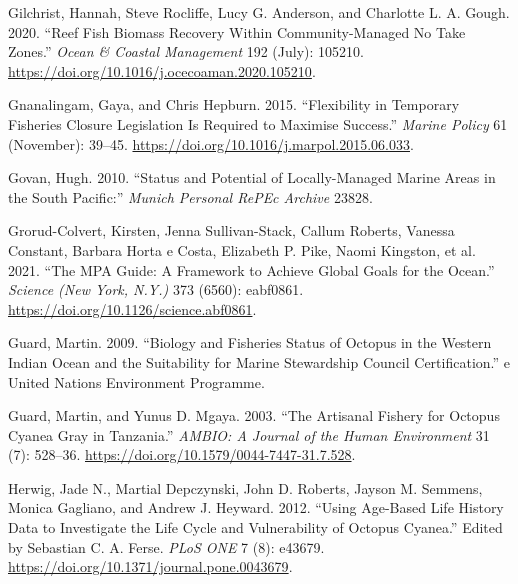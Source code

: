 \documentclass[
]{article}
\newlength{\cslhangindent}
\newlength{\cslentryspacingunit} %
\newenvironment{CSLReferences}[2] %
 {%
  \setlength{\parindent}{0pt}
  \ifodd #1
  \let\oldpar\par
  \def\par{\hangindent=\cslhangindent\oldpar}
  \fi
  \setlength{\parskip}{#2\cslentryspacingunit}
 }%
 {}
\begin{document}
\begin{CSLReferences}{1}{0}
\leavevmode{}%
Gilchrist, Hannah, Steve Rocliffe, Lucy G. Anderson, and Charlotte L. A. Gough. 2020. {``Reef Fish Biomass Recovery Within Community-Managed No Take Zones.''} \emph{Ocean \& Coastal Management} 192 (July): 105210. \url{https://doi.org/10.1016/j.ocecoaman.2020.105210}.

\leavevmode{}%
Gnanalingam, Gaya, and Chris Hepburn. 2015. {``Flexibility in Temporary Fisheries Closure Legislation Is Required to Maximise Success.''} \emph{Marine Policy} 61 (November): 39--45. \url{https://doi.org/10.1016/j.marpol.2015.06.033}.

\leavevmode{}%
Govan, Hugh. 2010. {``Status and Potential of Locally-Managed Marine Areas in the {South} {Pacific}:''} \emph{Munich Personal RePEc Archive} 23828.

\leavevmode{}%
Grorud-Colvert, Kirsten, Jenna Sullivan-Stack, Callum Roberts, Vanessa Constant, Barbara Horta e Costa, Elizabeth P. Pike, Naomi Kingston, et al. 2021. {``The {MPA} {Guide}: {A} Framework to Achieve Global Goals for the Ocean.''} \emph{Science (New York, N.Y.)} 373 (6560): eabf0861. \url{https://doi.org/10.1126/science.abf0861}.

\leavevmode{}%
Guard, Martin. 2009. {``Biology and Fisheries Status of Octopus in the {Western} {Indian} {Ocean} and the {Suitability} for Marine Stewardship Council Certification.''} e United Nations Environment Programme.

\leavevmode{}%
Guard, Martin, and Yunus D. Mgaya. 2003. {``The {Artisanal} {Fishery} for {Octopus} Cyanea {Gray} in {Tanzania}.''} \emph{AMBIO: A Journal of the Human Environment} 31 (7): 528--36. \url{https://doi.org/10.1579/0044-7447-31.7.528}.

\leavevmode{}%
Herwig, Jade N., Martial Depczynski, John D. Roberts, Jayson M. Semmens, Monica Gagliano, and Andrew J. Heyward. 2012. {``Using {Age}-{Based} {Life} {History} {Data} to {Investigate} the {Life} {Cycle} and {Vulnerability} of {Octopus} Cyanea.''} Edited by Sebastian C. A. Ferse. \emph{PLoS ONE} 7 (8): e43679. \url{https://doi.org/10.1371/journal.pone.0043679}.


\end{CSLReferences}
\end{document}
